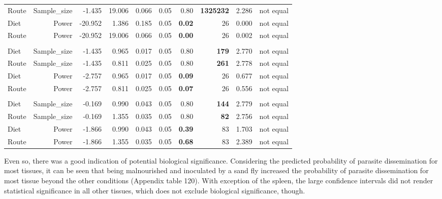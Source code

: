 \documentclass[
  12pt,
  letterpaper,
]{article}
\begin{document}
\begin{longtable}{l|rrrrrrrrr}
Route & Sample\_size & -1.435 & 19.006 & 0.066 & 0.05 & 0.80 & \textbf{1325232} & 2.286 & not equal \\ 
Diet & Power & -20.952 & 1.386 & 0.185 & 0.05 & \textbf{0.02} & 26 & 0.000 & not equal \\ 
Route & Power & -20.952 & 19.006 & 0.066 & 0.05 & \textbf{0.00} & 26 & 0.002 & not equal \\ 
\midrule\addlinespace[2.5pt]
\multicolumn{10}{l}{Paw} \\ 
\midrule\addlinespace[2.5pt]
Diet & Sample\_size & -1.435 & 0.965 & 0.017 & 0.05 & 0.80 & \textbf{179} & 2.770 & not equal \\ 
Route & Sample\_size & -1.435 & 0.811 & 0.025 & 0.05 & 0.80 & \textbf{261} & 2.778 & not equal \\ 
Diet & Power & -2.757 & 0.965 & 0.017 & 0.05 & \textbf{0.09} & 26 & 0.677 & not equal \\ 
Route & Power & -2.757 & 0.811 & 0.025 & 0.05 & \textbf{0.07} & 26 & 0.556 & not equal \\ 
\midrule\addlinespace[2.5pt]
\multicolumn{10}{l}{Spleen} \\ 
\midrule\addlinespace[2.5pt]
Diet & Sample\_size & -0.169 & 0.990 & 0.043 & 0.05 & 0.80 & \textbf{144} & 2.779 & not equal \\ 
Route & Sample\_size & -0.169 & 1.355 & 0.035 & 0.05 & 0.80 & \textbf{82} & 2.756 & not equal \\ 
Diet & Power & -1.866 & 0.990 & 0.043 & 0.05 & \textbf{0.39} & 83 & 1.703 & not equal \\ 
Route & Power & -1.866 & 1.355 & 0.035 & 0.05 & \textbf{0.68} & 83 & 2.389 & not equal \\ 
\bottomrule
\end{longtable}

Even so, there was a good indication of potential biological significance. Considering the predicted probability of parasite dissemination for most tissues, it can be seen that being malnourished and inoculated by a sand fly increased the probability of parasite dissemination for most tissue beyond the other conditions (Appendix table 120). With exception of the spleen, the large confidence intervals did not render statistical significance in all other tissues, which does not exclude biological significance, though.
\end{document}
